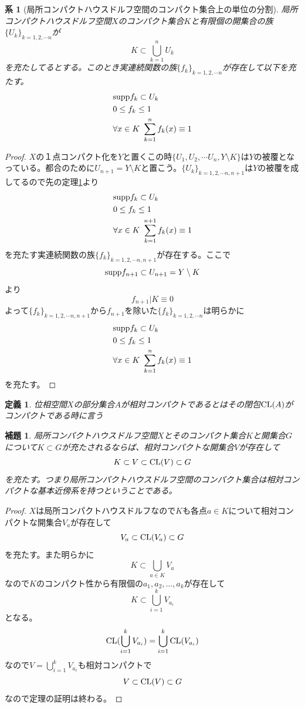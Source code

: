 \documentclass{jsarticle}
\newtheorem{cor}[thm]{系}
\newtheorem{lem}[thm]{補題}
\newtheorem{df}[thm]{定義}
\newcommand{\dpst}{\displaystyle}
\newcommand{\supp}{\text{{\rm supp}}}
\newcommand{\cl}{\text{{\rm CL}}}
\begin{document}
\begin{cor}[局所コンパクトハウスドルフ空間のコンパクト集合上の単位の分割]\label{pat}
局所コンパクトハウスドルフ空間$X$のコンパクト集合$K$と有限個の開集合の族
$\{U_k\}_{k=1,2,\cdots n}$が
\[
K\subset \bigcup_{k=1}^nU_k
\]を充たしてるとする。このとき実連続関数の族$\{f_k\}_{k=1,2,\cdots n}$が存在して以下を充たす。
\begin{eqnarray*}
&\supp f_k\subset U_k\\ 
&0\le f_k \le1\\ 
&\forall x\in K\ \sum_{k=1}^{n}f_k(x)\equiv 1
\end{eqnarray*}


\end{cor}
\begin{proof}
$X$の１点コンパクト化を$Y$と置くこの時$\{U_1,U_2,\cdots U_n,Y\setminus K\}$は$Y$の被覆となっている。都合のために$U_{n+1}=Y\setminus K$と置こう。$\{U_k\}_{k=1,2,\cdots n,n+1}$は$Y$の被覆を成してるので先の定理\ref{pat}より
\begin{eqnarray*}
&\supp f_k\subset U_k\\ 
&0\le f_k \le1\\ 
&\forall x\in K\ \sum_{k=1}^{n+1}f_k(x)\equiv 1
\end{eqnarray*}
を充たす実連続関数の族$\{f_k\}_{k=1,2,\cdots n,n+1}$が存在する。ここで
\[
\supp f_{n+1}\subset U_{n+1}=Y\setminus K
\]
より
\[
f_{n+1}|K\equiv0
\]
よって$\{f_k\}_{k=1,2,\cdots n,n+1}$から$f_{n+1}$を除いた$\{f_k\}_{k=1,2,\cdots n}$は明らかに
\begin{eqnarray*}
&\supp f_k\subset U_k\\ 
&0\le f_k \le1\\ 
&\forall x\in K\ \sum_{k=1}^{n}f_k(x)\equiv 1
\end{eqnarray*}
を充たす。
\end{proof}

\begin{df}
位相空間$X$の部分集合$A$が相対コンパクトであるとはその閉包$\cl(A)$がコンパクトである時に言う
\end{df}

\begin{lem}
局所コンパクトハウスドルフ空間$X$とそのコンパクト集合$K$と開集合$G$について$K\subset G$が充たされるならば、相対コンパクトな開集合$V$が存在して
\[
K\subset V\subset \cl(V) \subset G
\]
を充たす。つまり局所コンパクトハウスドルフ空間のコンパクト集合は相対コンパクトな基本近傍系を持つということである。
\end{lem}
\begin{proof}
$X$は局所コンパクトハウスドルフなので$K$も各点$a\in K$について相対コンパクトな開集合$V_a$が存在して
\[
V_a\subset \cl(V_a)\subset G
\]
を充たす。また明らかに
\[
K\subset \bigcup_{a\in K}V_a
\]
なので$K$のコンパクト性から有限個の$a_1,a_2,\dots ,a_k$が存在して
\[
K\subset \bigcup_{i=1}^{k}V_{a_i}
\]
となる。
\[
\cl(\bigcup_{i=1}^{k}V_{a_i})=\bigcup_{i=1}^{k}\cl(V_{a_i})
\]
なので$\dpst V=\bigcup_{i=1}^{k}V_{a_i}$も相対コンパクトで
\[
V\subset \cl(V)\subset G
\]
なので定理の証明は終わる。
\end{proof}
\end{document}
